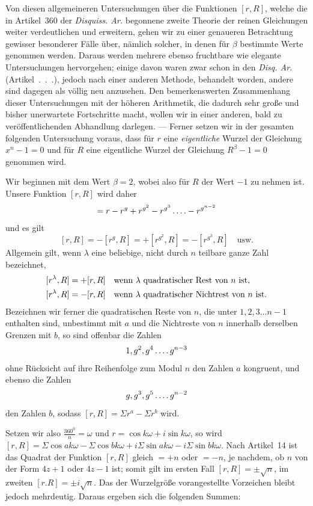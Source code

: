 Von diesen allgemeineren Untersuchungen über die Funktionen $[r,R]$, welche die in Artikel~360 der \emph{Disquiss. Ar.} begonnene zweite Theorie der reinen Gleichungen weiter verdeutlichen und erweitern, gehen wir zu einer genaueren Betrachtung gewisser besonderer Fälle über, nämlich solcher, in denen für $\beta$ bestimmte Werte genommen werden. Daraus werden mehrere ebenso fruchtbare wie elegante Untersuchungen hervorgehen; einige davon waren zwar schon in den \emph{Disq. Ar.} (Artikel\ .\ .\ .), jedoch nach einer anderen Methode, behandelt worden, andere sind dagegen als völlig neu anzusehen. Den bemerkenswerten Zusammenhang dieser Untersuchungen mit der höheren Arithmetik, die dadurch sehr große und bisher unerwartete Fortschritte macht, wollen wir in einer anderen, bald zu veröffentlichenden Abhandlung darlegen. — Ferner setzen wir in der gesamten folgenden Untersuchung voraus, dass für $r$ eine \emph{eigentliche} Wurzel der Gleichung $x^n-1=0$ und für $R$ eine eigentliche Wurzel der Gleichung $R^\beta-1=0$ genommen wird.

Wir beginnen mit dem Wert $\beta=2$, wobei also für $R$ der Wert $-1$ zu nehmen ist. Unsere Funktion $[r,R]$ wird daher
\[
=r-r^g+r^{g^2}-r^{g^3}\mathinner{.\,.\,.\,.}-r^{g^{n-2}}
\]
und es gilt
\[
[r,R]=-[r^g,R]=+[r^{g^2},R]=-[r^{g^3},R]\quad\text{usw.}
\]
Allgemein gilt, wenn $\lambda$ eine beliebige, nicht durch $n$ teilbare ganze Zahl bezeichnet,
\[
\begin{aligned}
\relax[r^\lambda,R]&=+[r,R]\quad\text{wenn }\lambda\text{ quadratischer Rest von }n\text{ ist},\\
\relax[r^\lambda,R]&=-[r,R]\quad\text{wenn }\lambda\text{ quadratischer Nichtrest von }n\text{ ist}.
\end{aligned}
\]
Bezeichnen wir ferner die quadratischen Reste von $n$, die unter $1,2,3\dots n-1$ enthalten sind, unbestimmt mit $a$ und die Nichtreste von $n$ innerhalb derselben Grenzen mit $b$, so sind offenbar die Zahlen
\[
1,g^2,g^4\mathinner{.\,.\,.\,.} g^{n-3}
\]
ohne Rücksicht auf ihre Reihenfolge zum Modul $n$ den Zahlen $a$ kongruent, und ebenso die Zahlen
\[
g,g^3,g^5\mathinner{.\,.\,.\,.} g^{n-2}
\]
den Zahlen $b$, sodass $[r,R]=\Sigma r^a-\Sigma r^b$ wird.

Setzen wir also $\frac{360^0}n=\omega$ und $r=\cos k\omega+i\sin k\omega$, so wird $[r,R]=\Sigma\cos ak\omega-\Sigma\cos bk\omega+i\Sigma\sin ak\omega-i\Sigma\sin bk\omega$. Nach Artikel~14 ist das Quadrat der Funktion $[r,R]$ gleich $=+n$ oder $=-n$, je nachdem, ob $n$ von der Form $4z+1$ oder $4z-1$ ist; somit gilt im ersten Fall $[r,R]=\pm\surd n$, im zweiten $[r.R]=\pm i\surd n$. Das der Wurzelgröße vorangestellte Vorzeichen bleibt jedoch mehrdeutig. Daraus ergeben sich die folgenden Summen:

